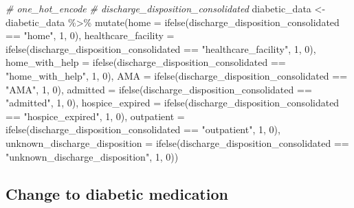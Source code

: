 \documentclass[
]{article}
\newenvironment{Shaded}{\begin{snugshade}}{\end{snugshade}}
\newcommand{\AttributeTok}[1]{\textcolor[rgb]{0.77,0.63,0.00}{#1}}
\newcommand{\CommentTok}[1]{\textcolor[rgb]{0.56,0.35,0.01}{\textit{#1}}}
\newcommand{\DecValTok}[1]{\textcolor[rgb]{0.00,0.00,0.81}{#1}}
\newcommand{\FunctionTok}[1]{\textcolor[rgb]{0.00,0.00,0.00}{#1}}
\newcommand{\NormalTok}[1]{#1}
\newcommand{\OtherTok}[1]{\textcolor[rgb]{0.56,0.35,0.01}{#1}}
\newcommand{\SpecialCharTok}[1]{\textcolor[rgb]{0.00,0.00,0.00}{#1}}
\newcommand{\StringTok}[1]{\textcolor[rgb]{0.31,0.60,0.02}{#1}}
\begin{document}
\begin{Shaded}
\begin{Highlighting}[]
\CommentTok{\# one\_hot\_encode}
\CommentTok{\# discharge\_disposition\_consolidated}
\NormalTok{diabetic\_data }\OtherTok{\textless{}{-}}\NormalTok{ diabetic\_data }\SpecialCharTok{\%\textgreater{}\%}
    \FunctionTok{mutate}\NormalTok{(}\AttributeTok{home =} \FunctionTok{ifelse}\NormalTok{(discharge\_disposition\_consolidated }\SpecialCharTok{==}
        \StringTok{"home"}\NormalTok{, }\DecValTok{1}\NormalTok{, }\DecValTok{0}\NormalTok{), }\AttributeTok{healthcare\_facility =} \FunctionTok{ifelse}\NormalTok{(discharge\_disposition\_consolidated }\SpecialCharTok{==}
        \StringTok{"healthcare\_facility"}\NormalTok{, }\DecValTok{1}\NormalTok{, }\DecValTok{0}\NormalTok{), }\AttributeTok{home\_with\_help =} \FunctionTok{ifelse}\NormalTok{(discharge\_disposition\_consolidated }\SpecialCharTok{==}
        \StringTok{"home\_with\_help"}\NormalTok{, }\DecValTok{1}\NormalTok{, }\DecValTok{0}\NormalTok{), }\AttributeTok{AMA =} \FunctionTok{ifelse}\NormalTok{(discharge\_disposition\_consolidated }\SpecialCharTok{==}
        \StringTok{"AMA"}\NormalTok{, }\DecValTok{1}\NormalTok{, }\DecValTok{0}\NormalTok{), }\AttributeTok{admitted =} \FunctionTok{ifelse}\NormalTok{(discharge\_disposition\_consolidated }\SpecialCharTok{==}
        \StringTok{"admitted"}\NormalTok{, }\DecValTok{1}\NormalTok{, }\DecValTok{0}\NormalTok{), }\AttributeTok{hospice\_expired =} \FunctionTok{ifelse}\NormalTok{(discharge\_disposition\_consolidated }\SpecialCharTok{==}
        \StringTok{"hospice\_expired"}\NormalTok{, }\DecValTok{1}\NormalTok{, }\DecValTok{0}\NormalTok{), }\AttributeTok{outpatient =} \FunctionTok{ifelse}\NormalTok{(discharge\_disposition\_consolidated }\SpecialCharTok{==}
        \StringTok{"outpatient"}\NormalTok{, }\DecValTok{1}\NormalTok{, }\DecValTok{0}\NormalTok{), }\AttributeTok{unknown\_discharge\_disposition =} \FunctionTok{ifelse}\NormalTok{(discharge\_disposition\_consolidated }\SpecialCharTok{==}
        \StringTok{"unknown\_discharge\_disposition"}\NormalTok{, }\DecValTok{1}\NormalTok{, }\DecValTok{0}\NormalTok{))}
\end{Highlighting}
\end{Shaded}

\hypertarget{change-to-diabetic-medication}{%
\subsection{Change to diabetic
medication}\label{change-to-diabetic-medication}}
\end{document}
